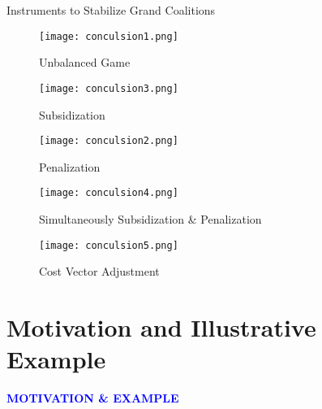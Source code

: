 \documentclass[14pt]{beamer}
\begin{document}
\begin{frame}{Instruments to Stabilize Grand Coalitions}
\begin{figure}[H]
\centering
\begin{minipage}[t]{0.32\textwidth}
\centering
\texttt{[image: conculsion1.png]}
\caption*{Unbalanced Game}
\end{minipage}
\begin{minipage}[t]{0.32\textwidth}
\centering
\texttt{[image: conculsion3.png]}
\caption*{Subsidization}
\end{minipage}
\begin{minipage}[t]{0.32\textwidth}
\centering
\texttt{[image: conculsion2.png]}
\caption*{Penalization}
\end{minipage}
\end{figure}
\begin{figure}[H]
\centering
\begin{minipage}[t]{0.49\textwidth}
\centering
\texttt{[image: conculsion4.png]}
\caption*{Simultaneously Subsidization \& Penalization}
\end{minipage}
\pause
\begin{minipage}[t]{0.49\textwidth}
\centering
\texttt{[image: conculsion5.png]}
\caption*{Cost Vector Adjustment}
\end{minipage}
\end{figure}
\end{frame}


\section{Motivation and Illustrative Example}
\begin{frame}
\centering
\large
\textcolor{blue}{\bf {\huge M}OTIVATION \& {\huge E}XAMPLE}
\end{frame}
\end{document}
